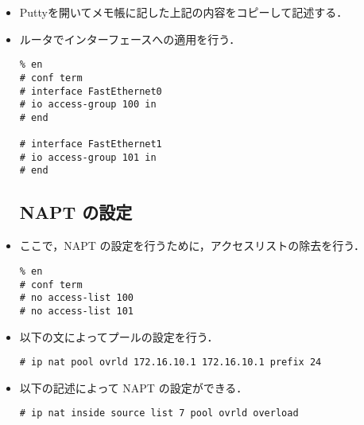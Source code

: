 \documentclass[a4j,titlepage]{jarticle}
\begin{document}
\begin{itemize}
\begin{itemize}
\item Puttyを開いてメモ帳に記した上記の内容をコピーして記述する．

\item ルータでインターフェースへの適用を行う．
  \begin{screen}
    \begin{center}
\begin{verbatim}
% en
# conf term
# interface FastEthernet0
# io access-group 100 in
# end

# interface FastEthernet1
# io access-group 101 in
# end
\end{verbatim}
    \end{center}
  \end{screen}

\subsection{NAPT の設定}
  
\item ここで，NAPT の設定を行うために，アクセスリストの除去を行う．
  
\begin{screen}
    \begin{center}
\begin{verbatim}
% en
# conf term
# no access-list 100
# no access-list 101
\end{verbatim}
    \end{center}
\end{screen}

\item 以下の文によってプールの設定を行う．
   \begin{screen}
    \begin{center}
\begin{verbatim}
# ip nat pool ovrld 172.16.10.1 172.16.10.1 prefix 24
\end{verbatim}
    \end{center}
   \end{screen}

\item 以下の記述によって NAPT の設定ができる．
   \begin{screen}
    \begin{center}
\begin{verbatim}
# ip nat inside source list 7 pool ovrld overload
\end{verbatim}
    \end{center}
   \end{screen}
 

\end{itemize}
\end{itemize}
\end{document}
